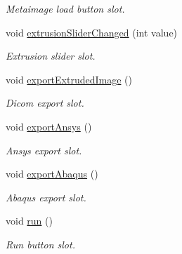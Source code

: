 \begin{DoxyCompactItemize}
\begin{DoxyCompactList}\small\item\em Metaimage load button slot. \item\end{DoxyCompactList}\item 
void \hyperlink{classgui_1_1_main_window_ab8feef1bc2150a62f309cac1fc98b1f2}{extrusionSliderChanged} (int value)
\begin{DoxyCompactList}\small\item\em Extrusion slider slot. \item\end{DoxyCompactList}\item 
\hypertarget{classgui_1_1_main_window_a972f3a47296041eb91d74163e5940ac3}{
void \hyperlink{classgui_1_1_main_window_a972f3a47296041eb91d74163e5940ac3}{exportExtrudedImage} ()}
\label{classgui_1_1_main_window_a972f3a47296041eb91d74163e5940ac3}

\begin{DoxyCompactList}\small\item\em Dicom export slot. \item\end{DoxyCompactList}\item 
\hypertarget{classgui_1_1_main_window_a9ac823ee2e8cc81201e3601b8478c92c}{
void \hyperlink{classgui_1_1_main_window_a9ac823ee2e8cc81201e3601b8478c92c}{exportAnsys} ()}
\label{classgui_1_1_main_window_a9ac823ee2e8cc81201e3601b8478c92c}

\begin{DoxyCompactList}\small\item\em Ansys export slot. \item\end{DoxyCompactList}\item 
\hypertarget{classgui_1_1_main_window_a174e0d0ab437a2408b385b35798dd659}{
void \hyperlink{classgui_1_1_main_window_a174e0d0ab437a2408b385b35798dd659}{exportAbaqus} ()}
\label{classgui_1_1_main_window_a174e0d0ab437a2408b385b35798dd659}

\begin{DoxyCompactList}\small\item\em Abaqus export slot. \item\end{DoxyCompactList}\item 
\hypertarget{classgui_1_1_main_window_ab0fc116fbb9cb1df7c2f7dfd019402ab}{
void \hyperlink{classgui_1_1_main_window_ab0fc116fbb9cb1df7c2f7dfd019402ab}{run} ()}
\label{classgui_1_1_main_window_ab0fc116fbb9cb1df7c2f7dfd019402ab}

\begin{DoxyCompactList}\small\item\em Run button slot. \item\end{DoxyCompactList}\end{DoxyCompactItemize}

